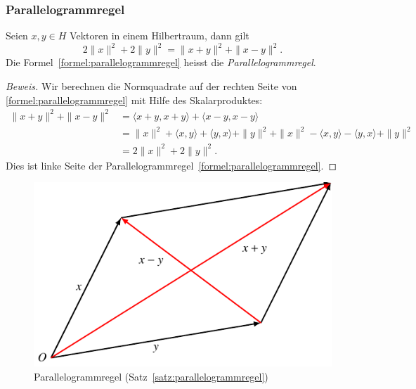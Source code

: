 \subsubsection{Parallelogrammregel}
%
\begin{satz}
\label{satz:parallelogrammregel}
Seien $x,y\in H$ Vektoren in einem Hilbertraum, dann gilt
\begin{equation}
2\|x\|^2 + 2\|y\|^2
=
\| x+y\|^2 + \|x-y\|^2.
\label{formel:parallelogrammregel}
\end{equation}
Die Formel~\eqref{formel:parallelogrammregel} heisst die
{\em Parallelogrammregel}.
\end{satz}

\begin{proof}[Beweis]
Wir berechnen die Normquadrate auf der rechten Seite von 
\eqref{formel:parallelogrammregel} mit Hilfe des Skalarproduktes:
\begin{align*}
\|x+y\|^2 + \|x-y\|^2
&=
\langle x+y,x+y\rangle + \langle x-y,x-y\rangle
\\
&=
\|x\|^2 + \langle x,y\rangle + \langle y,x\rangle + \|y\|^2
+
\|x\|^2 - \langle x,y\rangle - \langle y,x\rangle + \|y\|^2
\\
&=
2\|x\|^2 + 2\|y\|^2.
\end{align*}
Dies ist linke Seite der Parallelogrammregel~\eqref{formel:parallelogrammregel}.
\end{proof}

\begin{figure}
\centering
\includegraphics{chapters/1-geometrie/images/parallelogramm.pdf}
\caption{Parallelogrammregel (Satz~\ref{satz:parallelogrammregel})
\label{figure:parallelogrammregel}}
\end{figure}


